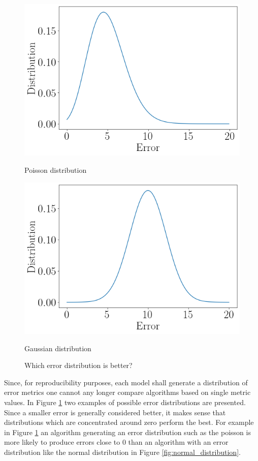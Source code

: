 \begin{figure}[htb]
  \centering
  \includegraphics[width=\linewidth]{./img/poisson_distribution.png}
  \caption{Poisson distribution}
  \label{fig:poisson_distribution}
  \endminipage\hfill
  \includegraphics[width=\linewidth]{./img/normal_distribution.png}
  \caption{Gaussian distribution}
  \label{fig:normal_distribution}
  \endminipage\hfill
  \caption{Which error distribution is better?}
  \label{fig:example_distributions}
\end{figure}


Since, for reproducibility purposes, each model shall generate a distribution of error metrics one cannot any longer compare algorithms based on single metric values. In Figure \ref{fig:example_distributions} two examples of possible error distributions are presented. Since a smaller error is generally considered better, it makes sense that distributions which are concentrated around zero perform the best. For example in Figure \ref{fig:example_distributions} an algorithm generating an error distribution such as the poisson is more likely to produce errors close to 0 than an algorithm with an error distribution like the normal distribution in Figure \ref{fig:normal_distribution}.

